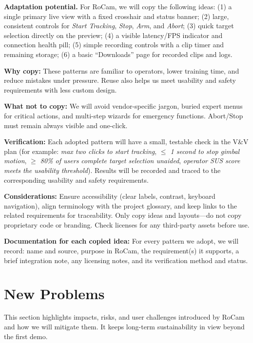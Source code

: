 \documentclass[12pt]{article}
\begin{document}
\textbf{Adaptation potential.}
For RoCam, we will copy the following ideas:
(1) a single primary live view with a fixed crosshair and status banner;
(2) large, consistent controls for \emph{Start Tracking}, \emph{Stop}, \emph{Arm}, and \emph{Abort};
(3) quick target selection directly on the preview;
(4) a visible latency/FPS indicator and connection health pill;
(5) simple recording controls with a clip timer and remaining storage;
(6) a basic “Downloads” page for recorded clips and logs.

\textbf{Why copy:}
These patterns are familiar to operators, lower training time, and reduce mistakes under pressure. Reuse also helps us meet usability and safety requirements with less custom design.

\textbf{What not to copy:}
We will avoid vendor-specific jargon, buried expert menus for critical actions, and multi-step wizards for emergency functions. Abort/Stop must remain always visible and one-click.

\textbf{Verification:}
Each adopted pattern will have a small, testable check in the V\&V plan (for example: \emph{max two clicks to start tracking}, \emph{$\leq$ 1 second to stop gimbal motion}, \emph{$\geq$ 80\% of users complete target selection unaided}, \emph{operator SUS score meets the usability threshold}). Results will be recorded and traced to the corresponding usability and safety requirements.

\textbf{Considerations:}
Ensure accessibility (clear labels, contrast, keyboard navigation), align terminology with the project glossary, and keep links to the related requirements for traceability. Only copy ideas and layouts—do not copy proprietary code or branding. Check licenses for any third-party assets before use.

\textbf{Documentation for each copied idea:}
For every pattern we adopt, we will record: name and source, purpose in RoCam, the requirement(s) it supports, a brief integration note, any licensing notes, and its verification method and status.


\section{New Problems}
This section highlights impacts, risks, and user challenges introduced by RoCam
and how we will mitigate them. It keeps long-term sustainability in view beyond
the first demo.
\end{document}
